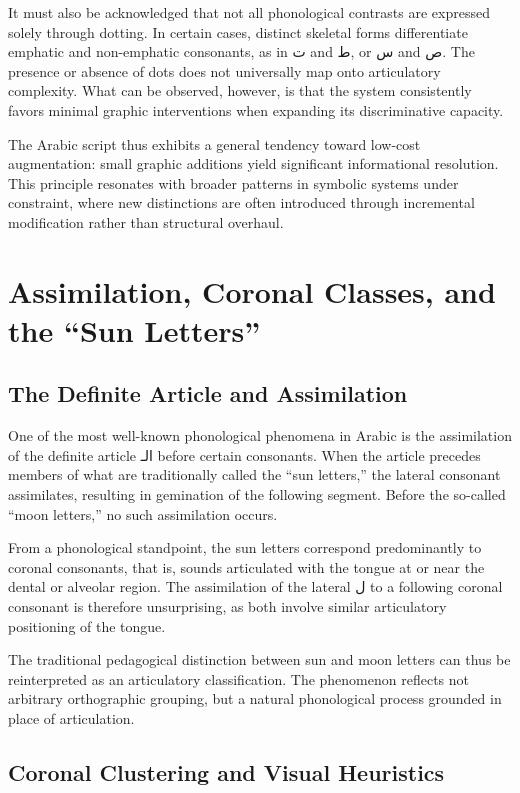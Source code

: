 \documentclass[11pt]{article}
\begin{document}
It must also be acknowledged that not all phonological contrasts are expressed solely through dotting. In certain cases, distinct skeletal forms differentiate emphatic and non-emphatic consonants, as in \textarabic{ت} and \textarabic{ط}, or \textarabic{س} and \textarabic{ص}. The presence or absence of dots does not universally map onto articulatory complexity. What can be observed, however, is that the system consistently favors minimal graphic interventions when expanding its discriminative capacity.

The Arabic script thus exhibits a general tendency toward low-cost augmentation: small graphic additions yield significant informational resolution. This principle resonates with broader patterns in symbolic systems under constraint, where new distinctions are often introduced through incremental modification rather than structural overhaul.

\section{Assimilation, Coronal Classes, and the ``Sun Letters''}

\subsection{The Definite Article and Assimilation}

One of the most well-known phonological phenomena in Arabic is the assimilation of the definite article \textarabic{الـ} before certain consonants. When the article precedes members of what are traditionally called the ``sun letters,'' the lateral consonant assimilates, resulting in gemination of the following segment. Before the so-called ``moon letters,'' no such assimilation occurs.

From a phonological standpoint, the sun letters correspond predominantly to coronal consonants, that is, sounds articulated with the tongue at or near the dental or alveolar region. The assimilation of the lateral \textarabic{ل} to a following coronal consonant is therefore unsurprising, as both involve similar articulatory positioning of the tongue.

The traditional pedagogical distinction between sun and moon letters can thus be reinterpreted as an articulatory classification. The phenomenon reflects not arbitrary orthographic grouping, but a natural phonological process grounded in place of articulation.

\subsection{Coronal Clustering and Visual Heuristics}
\end{document}
